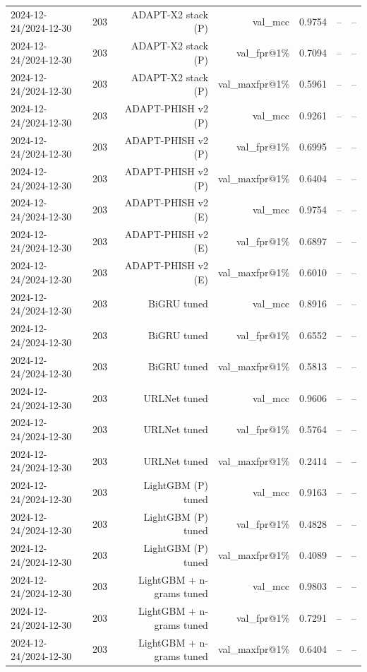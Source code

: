 \begin{table}[t]
\begin{tabular}{llrrrrr}
2024-12-24/2024-12-30 & 203 & ADAPT-X2 stack (P) & val\_mcc & 0.9754 & -- & -- \\
2024-12-24/2024-12-30 & 203 & ADAPT-X2 stack (P) & val\_fpr@1\% & 0.7094 & -- & -- \\
2024-12-24/2024-12-30 & 203 & ADAPT-X2 stack (P) & val\_maxfpr@1\% & 0.5961 & -- & -- \\
2024-12-24/2024-12-30 & 203 & ADAPT-PHISH v2 (P) & val\_mcc & 0.9261 & -- & -- \\
2024-12-24/2024-12-30 & 203 & ADAPT-PHISH v2 (P) & val\_fpr@1\% & 0.6995 & -- & -- \\
2024-12-24/2024-12-30 & 203 & ADAPT-PHISH v2 (P) & val\_maxfpr@1\% & 0.6404 & -- & -- \\
2024-12-24/2024-12-30 & 203 & ADAPT-PHISH v2 (E) & val\_mcc & 0.9754 & -- & -- \\
2024-12-24/2024-12-30 & 203 & ADAPT-PHISH v2 (E) & val\_fpr@1\% & 0.6897 & -- & -- \\
2024-12-24/2024-12-30 & 203 & ADAPT-PHISH v2 (E) & val\_maxfpr@1\% & 0.6010 & -- & -- \\
2024-12-24/2024-12-30 & 203 & BiGRU tuned & val\_mcc & 0.8916 & -- & -- \\
2024-12-24/2024-12-30 & 203 & BiGRU tuned & val\_fpr@1\% & 0.6552 & -- & -- \\
2024-12-24/2024-12-30 & 203 & BiGRU tuned & val\_maxfpr@1\% & 0.5813 & -- & -- \\
2024-12-24/2024-12-30 & 203 & URLNet tuned & val\_mcc & 0.9606 & -- & -- \\
2024-12-24/2024-12-30 & 203 & URLNet tuned & val\_fpr@1\% & 0.5764 & -- & -- \\
2024-12-24/2024-12-30 & 203 & URLNet tuned & val\_maxfpr@1\% & 0.2414 & -- & -- \\
2024-12-24/2024-12-30 & 203 & LightGBM (P) tuned & val\_mcc & 0.9163 & -- & -- \\
2024-12-24/2024-12-30 & 203 & LightGBM (P) tuned & val\_fpr@1\% & 0.4828 & -- & -- \\
2024-12-24/2024-12-30 & 203 & LightGBM (P) tuned & val\_maxfpr@1\% & 0.4089 & -- & -- \\
2024-12-24/2024-12-30 & 203 & LightGBM + n-grams tuned & val\_mcc & 0.9803 & -- & -- \\
2024-12-24/2024-12-30 & 203 & LightGBM + n-grams tuned & val\_fpr@1\% & 0.7291 & -- & -- \\
2024-12-24/2024-12-30 & 203 & LightGBM + n-grams tuned & val\_maxfpr@1\% & 0.6404 & -- & -- \\

\end{tabular}
\end{table}
